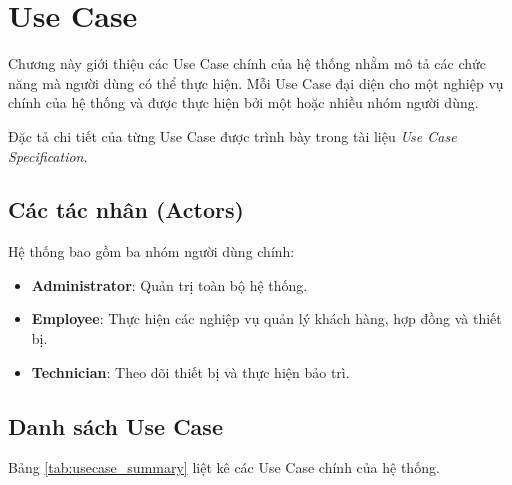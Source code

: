 \chapter{Use Case}

Chương này giới thiệu các Use Case chính của hệ thống nhằm mô tả các chức năng mà người dùng có thể thực hiện. Mỗi Use Case đại diện cho một nghiệp vụ chính của hệ thống và được thực hiện bởi một hoặc nhiều nhóm người dùng.

Đặc tả chi tiết của từng Use Case được trình bày trong tài liệu \textit{Use Case Specification}.

\section{Các tác nhân (Actors)}

Hệ thống bao gồm ba nhóm người dùng chính:

\begin{itemize}
    \item \textbf{Administrator}: Quản trị toàn bộ hệ thống.
    \item \textbf{Employee}: Thực hiện các nghiệp vụ quản lý khách hàng, hợp đồng và thiết bị.
    \item \textbf{Technician}: Theo dõi thiết bị và thực hiện bảo trì.
\end{itemize}

\section{Danh sách Use Case}

Bảng \ref{tab:usecase_summary} liệt kê các Use Case chính của hệ thống.

